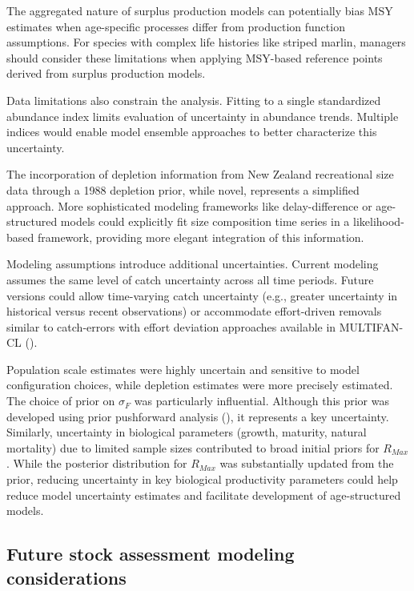\documentclass[
  11pt,
]{SCreport}
\begin{document}
The aggregated nature of surplus production models can potentially bias
MSY estimates when age-specific processes differ from production
function assumptions. For species with complex life histories like
striped marlin, managers should consider these limitations when applying
MSY-based reference points derived from surplus production models.

Data limitations also constrain the analysis. Fitting to a single
standardized abundance index limits evaluation of uncertainty in
abundance trends. Multiple indices would enable model ensemble
approaches to better characterize this uncertainty.

The incorporation of depletion information from New Zealand recreational
size data through a 1988 depletion prior, while novel, represents a
simplified approach. More sophisticated modeling frameworks like
delay-difference or age-structured models could explicitly fit size
composition time series in a likelihood-based framework, providing more
elegant integration of this information.

Modeling assumptions introduce additional uncertainties. Current
modeling assumes the same level of catch uncertainty across all time
periods. Future versions could allow time-varying catch uncertainty
(e.g., greater uncertainty in historical versus recent observations) or
accommodate effort-driven removals similar to catch-errors with effort
deviation approaches available in MULTIFAN-CL
().

Population scale estimates were highly uncertain and sensitive to model
configuration choices, while depletion estimates were more precisely
estimated. The choice of prior on \(\sigma_F\) was particularly
influential. Although this prior was developed using prior pushforward
analysis (), it
represents a key uncertainty. Similarly, uncertainty in biological
parameters (growth, maturity, natural mortality) due to limited sample
sizes contributed to broad initial priors for \(R_{Max}\). While the
posterior distribution for \(R_{Max}\) was substantially updated from
the prior, reducing uncertainty in key biological productivity
parameters could help reduce model uncertainty estimates and facilitate
development of age-structured models.

\subsection{Future stock assessment modeling
considerations}\label{future-stock-assessment-modeling-considerations}
\end{document}
